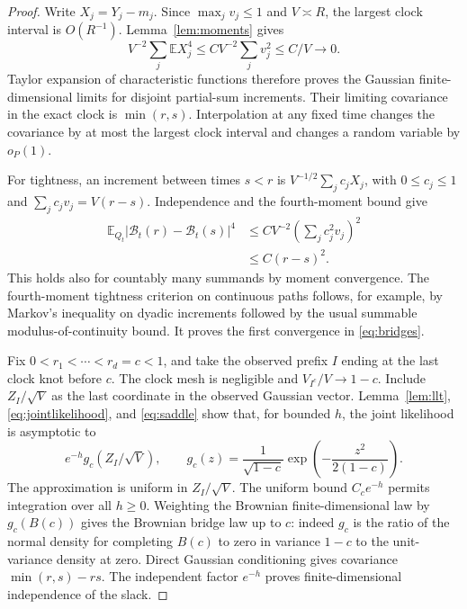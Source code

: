 \documentclass[11pt,a4paper]{article}
\numberwithin{equation}{section}
\theoremstyle{definition}
\theoremstyle{remark}
\newcommand{\E}{\mathbb E}
\begin{document}
\begin{proof}
Write $X_j=Y_j-m_j$. Since $\max_jv_j\le1$ and $V\asymp R$,
the largest clock interval is $O(R^{-1})$. Lemma~\ref{lem:moments}
gives
\[
 V^{-2}\sum_j\E X_j^4
 \le C V^{-2}\sum_jv_j^2\le C/V\longrightarrow0.
\]
Taylor expansion of characteristic functions therefore proves the
Gaussian finite-dimensional limits for disjoint partial-sum increments.
Their limiting covariance in the exact clock is $\min(r,s)$.
Interpolation at any fixed time changes the covariance by at most the
largest clock interval and changes a random variable by $o_P(1)$.

For tightness, an increment between times $s<r$ is
$V^{-1/2}\sum_jc_jX_j$, with $0\le c_j\le1$ and
$\sum_jc_jv_j=V(r-s)$. Independence and the fourth-moment bound give
\begin{align*}
 \E_{Q_t}|\mathcal B_t(r)-\mathcal B_t(s)|^4
 &\le C V^{-2}\left(\sum_jc_j^2v_j\right)^2\\
 &\le C(r-s)^2.
\end{align*}
This holds also for countably many summands by moment convergence.
The fourth-moment tightness criterion on continuous paths follows,
for example, by Markov's inequality on dyadic increments followed by
the usual summable modulus-of-continuity bound. It proves the first
convergence in \eqref{eq:bridges}.

Fix $0<r_1<\cdots<r_d=c<1$, and take the observed prefix $I$ ending
at the last clock knot before $c$. The clock mesh is negligible and
$V_{I^c}/V\to1-c$. Include $Z_I/\sqrt V$ as the last coordinate in
the observed Gaussian vector. Lemma~\ref{lem:llt},
\eqref{eq:jointlikelihood}, and \eqref{eq:saddle} show that, for
bounded $h$, the joint likelihood is asymptotic to
\begin{equation}
 e^{-h}g_c(Z_I/\sqrt V),\qquad
 g_c(z)=\frac1{\sqrt{1-c}}
          \exp\!\left(-\frac{z^2}{2(1-c)}\right).
 \label{eq:gaussianweight}
\end{equation}
The approximation is uniform in $Z_I/\sqrt V$. The uniform bound
$C_c e^{-h}$ permits integration over all $h\ge0$.
Weighting the Brownian finite-dimensional law by $g_c(B(c))$ gives
the Brownian bridge law up to $c$: indeed $g_c$ is the ratio of the
normal density for completing $B(c)$ to zero in variance $1-c$ to
the unit-variance density at zero. Direct Gaussian conditioning gives
covariance $\min(r,s)-rs$. The independent factor $e^{-h}$ proves
finite-dimensional independence of the slack.


\end{proof}
\end{document}
